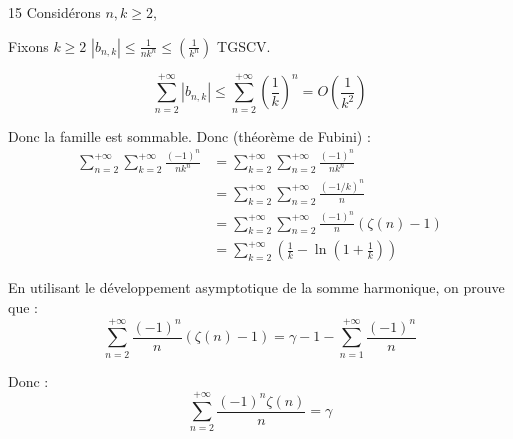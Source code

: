 \begin{correction}{15}
    Considérons $n, k \geqslant 2$,

    Fixons $k \geqslant 2$
    $|b_{n,k}| \leqslant \frac 1 {nk^n} \leqslant \left(\frac 1 {k^n}\right)$  TGSCV.

    $$ \sum_{n=2}^{+\infty} |b_{n,k}| \leqslant \sum_{n=2}^{+\infty} \left(\frac 1 k\right)^n = O(\frac 1 {k^2})$$

    Donc la famille est sommable.
    Donc (théorème de Fubini) :
    \begin{align*}
        \sum_{n=2}^{+\infty} \sum_{k=2}^{+\infty} \frac {(-1)^n}{nk^n} &= \sum_{k=2}^{+\infty} \sum_{n=2}^{+\infty} \frac {(-1)^n}{nk^n}\\
            &= \sum_{k=2}^{+\infty} \sum_{n=2}^{+\infty} \frac {(-1/k)^n}{n}\\
            &= \sum_{k=2}^{+\infty} \sum_{n=2}^{+\infty} \frac {(-1)^n}{n} (\zeta(n) - 1)\\
            &= \sum_{k=2}^{+\infty} \left(\frac 1 k - \ln\left(1 + \frac 1 k\right)\right)
    \end{align*}

    En utilisant le développement asymptotique de la somme harmonique, on prouve que :
    $$\sum_{n=2}^{+\infty} \frac {(-1)^n} n (\zeta(n) - 1) = \gamma - 1 - \sum_{n=1}^{+\infty} \frac {(-1)^n} n$$

    Donc :
    $$\sum_{n=2}^{+\infty} \frac {(-1)^n\zeta(n)} n = \gamma$$
\end{correction}

